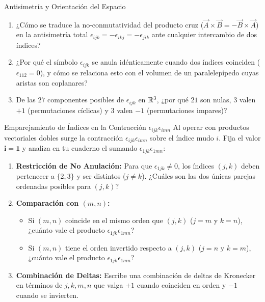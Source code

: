 \documentclass[10pt,aspectratio=169]{beamer}
\begin{document}
\begin{frame}{Antisimetría y Orientación del Espacio}
  \vspace{0.2cm}
  \small
  \begin{enumerate}\itemsep14pt
    \item ¿Cómo se traduce la no-conmutatividad del producto cruz ($\vec{A}\times\vec{B} = -\vec{B}\times\vec{A}$) en la antisimetría total $\epsilon_{ijk} = -\epsilon_{ikj} = -\epsilon_{jik}$ ante cualquier intercambio de dos índices?
    \item ¿Por qué el símbolo $\epsilon_{ijk}$ se anula idénticamente cuando dos índices coinciden ($\epsilon_{112} = 0$), y cómo se relaciona esto con el volumen de un paralelepípedo cuyas aristas son coplanares?
    \item De las $27$ componentes posibles de $\epsilon_{ijk}$ en $\mathbb{R}^3$, ¿por qué $21$ son nulas, $3$ valen $+1$ (permutaciones cíclicas) y $3$ valen $-1$ (permutaciones impares)?
  \end{enumerate}
\end{frame}

\begin{frame}{Emparejamiento de Índices en la Contracción $\epsilon_{ijk}\epsilon_{imn}$}
  \vspace{0.05cm}
  Al operar con productos vectoriales dobles surge la contracción $\epsilon_{ijk}\epsilon_{imn}$ sobre el índice mudo $i$. Fija el valor $\mathbf{i = 1}$ y analiza en tu cuaderno el sumando $\epsilon_{1jk}\epsilon_{1mn}$:
  \vspace{0.25cm}
  \begin{enumerate}\itemsep10pt
    \item[(a)] \textbf{Restricción de No Anulación:} Para que $\epsilon_{1jk} \neq 0$, los índices $(j, k)$ deben pertenecer a $\{2, 3\}$ y ser distintos ($j \neq k$). ¿Cuáles son las dos únicas parejas ordenadas posibles para $(j, k)$?
    \item[(b)] \textbf{Comparación con $(m, n)$:}
    \begin{itemize}\itemsep2pt
      \item Si $(m, n)$ coincide en el mismo orden que $(j, k)$ ($j = m$ y $k = n$), ¿cuánto vale el producto $\epsilon_{1jk}\epsilon_{1mn}$?
      \item Si $(m, n)$ tiene el orden invertido respecto a $(j, k)$ ($j = n$ y $k = m$), ¿cuánto vale el producto $\epsilon_{1jk}\epsilon_{1mn}$?
    \end{itemize}
    \item[(c)] \textbf{Combinación de Deltas:} Escribe una combinación de deltas de Kronecker en términos de $j, k, m, n$ que valga $+1$ cuando coinciden en orden y $-1$ cuando se invierten.
  \end{enumerate}
\end{frame}
\end{document}
